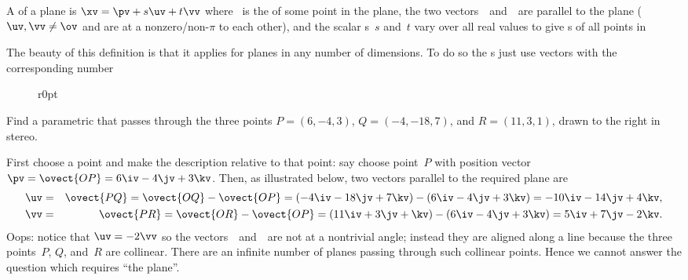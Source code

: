 \begin{definition} \label{def:parpla}
A  of a plane is \(\xv=\pv+s\uv+t\vv\) where \pv~is the  of some point in the plane,   the two vectors~\uv\ and~\vv\ are parallel to the plane (\(\uv,\vv\neq\ov\) and are at a nonzero\slash non-\(\pi\)  to each other), and the scalar s~\(s\) and~\(t\) vary over all real values to give s of all points in 
\end{definition}

The beauty of this definition is that it applies for planes in any number of dimensions.
To do so the s just use vectors with the corresponding number 

\begin{wrapfigure}[8]r{0pt}
 {}
\end{wrapfigure}
\begin{example} 
Find a parametric  that passes through the three points \(P=(6,-4,3)\), \(Q=(-4,-18,7)\), and \(R=(11,3,1)\), drawn to the right in stereo.

\begin{solution} 
First choose a point and make the description relative to that point: say choose point~\(P\) with position vector \(\pv=\ovect{OP}=6\iv-4\jv+3\kv\).
Then, as illustrated below, two vectors parallel to the required plane are 
\begin{eqnarray*}
\uv&=&\ovect{PQ} =\ovect{OQ}-\ovect{OP} 
=(-4\iv-18\jv+7\kv)-(6\iv-4\jv+3\kv) 
=-10\iv-14\jv+4\kv,
\\\vv&=&\ovect{PR} =\ovect{OR}-\ovect{OP} 
=(11\iv+3\jv+\kv)-(6\iv-4\jv+3\kv) 
=5\iv+7\jv-2\kv.
\end{eqnarray*}
Oops: notice that \(\uv=-2\vv\) so the vectors~\uv\ and~\vv\ are not at a nontrivial angle; instead they are aligned along a line because the three points~\(P\), \(Q\), and~\(R\) are collinear.
There are an infinite number of planes passing through such collinear  points.
Hence we cannot answer the question which requires ``the plane''.
\end{solution}
\end{example}


